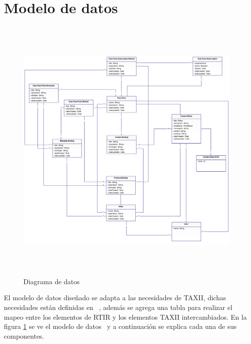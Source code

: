 	
	\bigskip
	
	\section{Modelo de datos}
	
	\begin{figure}[H]
		\centering
		\includegraphics[width=5.7638in,height=5.3126in]{Diseno21-img/Diseno21-img004.png} 
		\caption{Diagrama de datos}
		\label{fig.diagramadedatos}
	\end{figure}
	El modelo de datos diseñado se adapta a las necesidades de TAXII, dichas necesidades están
		definidas en \ \cite{M15}, además se agrega una tabla para realizar el mapeo entre los elementos de RTIR y los elementos
		TAXII intercambiados. En la figura \ref{fig.diagramadedatos} se ve el modelo de datos \ y a continuación se explica cada una de sus
		componentes.
	
	
	\bigskip
	
